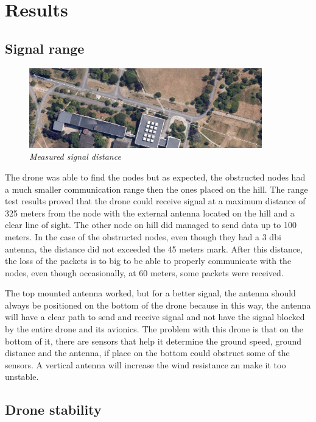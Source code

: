 \section{Results}

 
\subsection{Signal range}

\begin{figure}[ht]
\begin{center}
\includegraphics[width=0.9\textwidth]{img/distance.png}
\end{center}
\caption{\small \itshape{Measured signal distance}}
\end{figure}


The drone was able to find the nodes but as expected, the obstructed nodes had a much smaller communication range then the ones placed on the hill. The range test results proved that the drone could receive signal at a maximum distance of 325 meters from the node with the external antenna located on the hill and a clear line of sight. The other node on hill did managed to send data up to 100 meters. In the case of the obstructed nodes, even though they had a 3 dbi antenna, the distance did not exceeded the 45 meters mark. After this distance, the loss of the packets is to big to be able to properly communicate with the nodes, even though occasionally, at 60 meters, some packets were received.


The top mounted antenna worked, but for a better signal, the antenna should always be positioned on the bottom of the drone because in this way, the antenna will have a clear path to send and receive signal and not have the signal blocked by the entire drone and its avionics. The problem with this drone is that on the bottom of it, there are sensors that help it determine the ground speed, ground distance and the antenna, if place on the bottom could obstruct some of the sensors. A vertical antenna will increase the wind resistance an make it too unstable.


\subsection{Drone stability}

